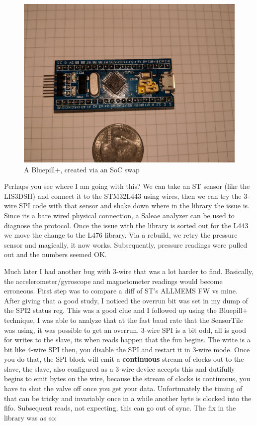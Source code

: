 \documentclass[11pt]{article}
\numberwithin{figure}{section}
\begin{document}
\begin{figure}[H] %
\centering
\includegraphics[scale=0.5]{bluepillplus.jpg}
\caption{A Bluepill+, created via an SoC swap}
\label{Figure:Bluepill+}
\end{figure}

Perhaps you see where I am going with this? We can take an ST sensor
(like the LIS3DSH) and connect it to the STM32L443 using wires, then
we can try the 3-wire SPI code with that sensor and shake down where
in the library the issue is. Since its a bare wired physical
connection, a Saleae analyzer can be used to diagnose the protocol.
Once the issue with the library is sorted out for the L443
we move the change to the L476 library. Via a rebuild, we retry the
pressure sensor and magically, it now works. Subsequently, pressure
readings were pulled out and the numbers seemed OK.

Much later I had another bug with 3-wire that was a lot harder to
find. Basically, the accelerometer/gyroscope and magnetometer readings
would become erroneous. First step was to compare a diff of ST's
ALLMEMS FW vs mine. After giving that a good study, I noticed the
overrun bit was set in my dump of the SPI2 status reg. This was a good
clue and I followed up using the {Bluepill+} technique, I was able to
analyze that at the fast baud rate that the SensorTile was using, it
was possible to get an overrun. 3-wire SPI is a bit odd, all is good
for writes to the slave, its when reads happen that the fun
begins. The write is a bit like 4-wire SPI then, you disable the SPI
and restart it in 3-wire mode. Once you do that, the SPI block will
emit a \textbf{continuous} stream of clocks out to the slave, the
slave, also configured as a 3-wire device accepts this and dutifully
begins to emit bytes on the wire, because the stream of clocks is
continuous, you have to shut the valve off once you get your
data. Unfortunately the timing of that can be tricky and invariably
once in a while another byte is clocked into the fifo. Subsequent
reads, not expecting, this can go out of sync. The fix in the library
was as so:
\end{document}
